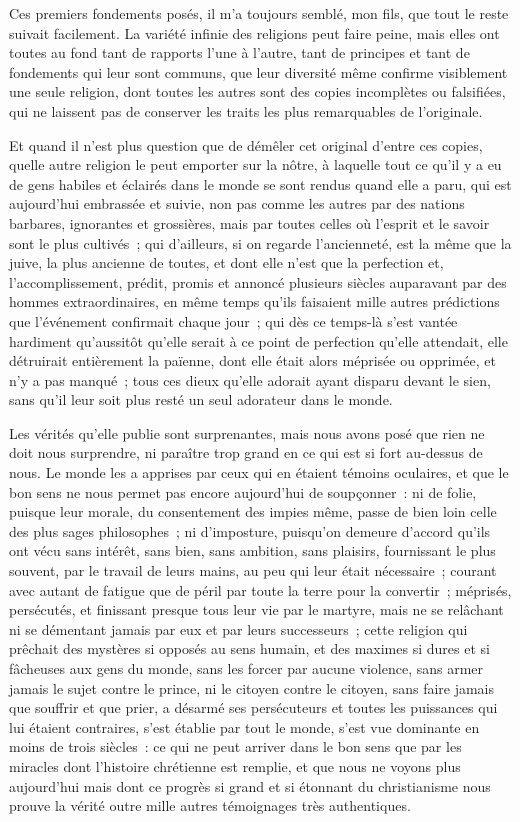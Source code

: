 \documentclass[french,twoside]{book} %
\begin{document}
Ces premiers fondements posés, il m’a toujours semblé, mon fils, que tout le reste suivait facilement. La variété infinie des religions peut faire peine, mais elles ont toutes au fond tant de rapports l’une à l’autre, tant de principes et tant de fondements qui leur sont communs, que leur diversité même confirme visiblement une seule religion, dont toutes les autres sont des copies incomplètes ou falsifiées, qui ne laissent pas de conserver les traits les plus remarquables de l’originale.\par
Et quand il n’est plus question que de démêler cet original d’entre ces copies, quelle autre religion le peut emporter sur la nôtre, à laquelle tout ce qu’il y a eu de gens habiles et éclairés dans le monde se sont rendus quand elle a paru, qui est aujourd’hui embrassée et suivie, non pas comme les autres par des nations barbares, ignorantes et grossières, mais par toutes celles où l’esprit et le savoir sont le plus cultivés ; qui d’ailleurs, si on regarde l’ancienneté, est la même que la juive, la plus ancienne de toutes, et dont elle n’est que la perfection et, l’accomplissement, prédit, promis et annoncé plusieurs siècles auparavant par des hommes extraordinaires, en même temps qu’ils faisaient mille autres prédictions que l’événement confirmait chaque jour ; qui dès ce temps-là s’est vantée hardiment qu’aussitôt qu’elle serait à ce point de perfection qu’elle attendait, elle détruirait entièrement la païenne, dont elle était alors méprisée ou opprimée, et n’y a pas manqué ; tous ces dieux qu’elle adorait ayant disparu devant le sien, sans qu’il leur soit plus resté un seul adorateur dans le monde.\par
Les vérités qu’elle publie sont surprenantes, mais nous avons posé que rien ne doit nous surprendre, ni paraître trop grand en ce qui est si fort au-dessus de nous. Le monde les a apprises par ceux qui en étaient témoins oculaires, et que le bon sens ne nous permet pas encore aujourd’hui de soupçonner : ni de folie, puisque leur morale, du consentement des impies même, passe de bien loin celle des plus sages philosophes ; ni d’imposture, puisqu’on demeure d’accord qu’ils ont vécu sans intérêt, sans bien, sans ambition, sans plaisirs, fournissant le plus souvent, par le travail de leurs mains, au peu qui leur était nécessaire ; courant avec autant de fatigue que de péril par toute la terre pour la convertir ; méprisés, persécutés, et finissant presque tous leur vie par le martyre, mais ne se relâchant ni se démentant jamais par eux et par leurs successeurs ; cette religion qui prêchait des mystères si opposés au sens humain, et des maximes si dures et si fâcheuses aux gens du monde, sans les forcer par aucune violence, sans armer jamais le sujet contre le prince, ni le citoyen contre le citoyen, sans faire jamais que souffrir et que prier, a désarmé ses persécuteurs et toutes les puissances qui lui étaient contraires, s’est établie par tout le monde, s’est vue dominante en moins de trois siècles : ce qui ne peut arriver dans le bon sens que par les miracles dont l’histoire chrétienne est remplie, et que nous ne voyons plus aujourd’hui mais dont ce progrès si grand et si étonnant du christianisme nous prouve la vérité outre mille autres témoignages très authentiques.\par
\end{document}
